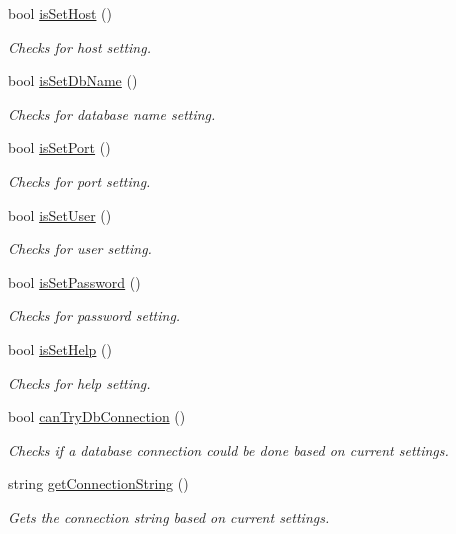 \begin{DoxyCompactItemize}
bool \hyperlink{classfwi_1_1CommandLineArguments_aff14b156dfdadee9a5ae2ba06976ecb0}{is\-Set\-Host} ()
\begin{DoxyCompactList}\small\item\em Checks for host setting. \end{DoxyCompactList}\item 
bool \hyperlink{classfwi_1_1CommandLineArguments_a883bd2b54b445dd1853d8771537fd2c3}{is\-Set\-Db\-Name} ()
\begin{DoxyCompactList}\small\item\em Checks for database name setting. \end{DoxyCompactList}\item 
bool \hyperlink{classfwi_1_1CommandLineArguments_a587ef2a70389522c52277c1aa49f0f22}{is\-Set\-Port} ()
\begin{DoxyCompactList}\small\item\em Checks for port setting. \end{DoxyCompactList}\item 
bool \hyperlink{classfwi_1_1CommandLineArguments_a72d8f5d8be37affd36adc02c7c7f81d6}{is\-Set\-User} ()
\begin{DoxyCompactList}\small\item\em Checks for user setting. \end{DoxyCompactList}\item 
bool \hyperlink{classfwi_1_1CommandLineArguments_a887eaacdc364872e66d8a487ea1f2285}{is\-Set\-Password} ()
\begin{DoxyCompactList}\small\item\em Checks for password setting. \end{DoxyCompactList}\item 
bool \hyperlink{classfwi_1_1CommandLineArguments_acfc136e2da1c2519e94d56ee6b897790}{is\-Set\-Help} ()
\begin{DoxyCompactList}\small\item\em Checks for help setting. \end{DoxyCompactList}\item 
bool \hyperlink{classfwi_1_1CommandLineArguments_a157e286d1dfd5ab7b7ee4e69f85bbc09}{can\-Try\-Db\-Connection} ()
\begin{DoxyCompactList}\small\item\em Checks if a database connection could be done based on current settings. \end{DoxyCompactList}\item 
string \hyperlink{classfwi_1_1CommandLineArguments_aa3f9cdc1eedaf1d795f2921a7ecb6367}{get\-Connection\-String} ()
\begin{DoxyCompactList}\small\item\em Gets the connection string based on current settings. \end{DoxyCompactList}\end{DoxyCompactItemize}


